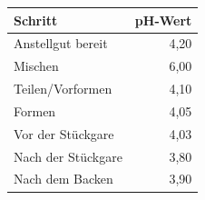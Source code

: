 \begin{tabular}{@{}lr@{}}
\toprule
\textbf{Schritt}       & {\textbf{pH-Wert}} \\ \midrule
Anstellgut bereit       & 4,20                \\
Mischen              & 6,00                \\
Teilen/Vorformen & 4,10                \\
Formen             & 4,05                \\
Vor der Stückgare     & 4,03                \\
Nach der Stückgare      & 3,80                \\
Nach dem Backen        & 3,90                \\ \bottomrule
\end{tabular}
